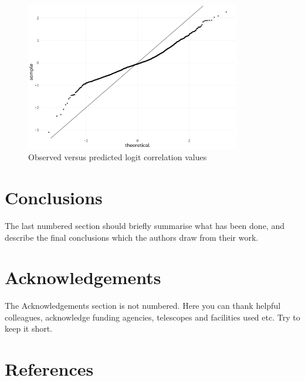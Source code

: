 \documentclass[a4paper,fleqn,usenatbib]{mnras}
\begin{document}
\begin{figure}
  \includegraphics[width=\columnwidth, height = 6.5cm]{figures/residuals-qq}
    \caption{Observed versus predicted logit correlation values}
    \label{fig:residuals-qq}
\end{figure}

\hypertarget{conclusions}{%
\section{Conclusions}\label{conclusions}}

The last numbered section should briefly summarise what has been done,
and describe the final conclusions which the authors draw from their
work.

\hypertarget{acknowledgements}{%
\section*{Acknowledgements}\label{acknowledgements}}

The Acknowledgements section is not numbered. Here you can thank helpful
colleagues, acknowledge funding agencies, telescopes and facilities used
etc. Try to keep it short.

\hypertarget{references}{%
\section*{References}\label{references}}
\end{document}
